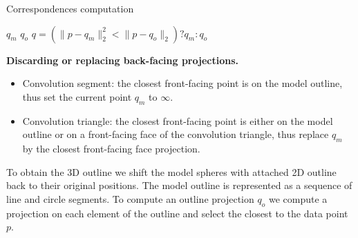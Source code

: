 
% 

\begin{algorithm}
\caption{Correspondences computation}
\begin{algorithmic}[1]
    	 \State {} $q_m$
    	 \State {}
    	 \State {} $q_o$
         \State $q=(\|{p - q_m}\|_2^2 < \|{p - q_o}\|_2) ? q_m : q_o$
    \EndFor
\end{algorithmic}
\label{alg:correspondences}
\end{algorithm}


\textbf{Discarding or replacing back-facing projections.}
\begin{itemize}
	\item Convolution segment: the closest front-facing point is on the model outline, thus set the current point $q_m$ to $\infty$.
	\item Convolution triangle: the closest front-facing point is either on the model outline or on a front-facing face of the convolution triangle, thus replace $q_m$ by the closest front-facing face projection.
\end{itemize}

To obtain the 3D outline we shift the model spheres with attached 2D outline back to their original positions. The model outline is represented as a sequence of line and circle segments. To compute an outline projection $q_o$ we compute a projection on each element of the outline and select the closest to the data point $p$.


